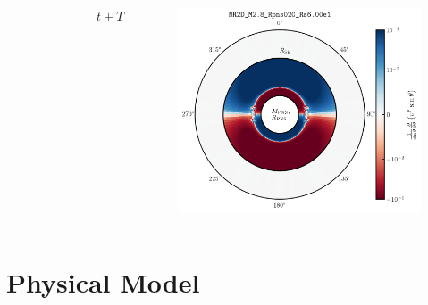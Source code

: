 \documentclass{beamer}
\begin{document}
\begin{frame}
\begin{columns}[c]
\begin{figure}[htb!]
      \end{figure}
      \centerline{$t+T$}
      \begin{figure}[htb!]
        \centering
        \includegraphics[width=\textwidth]{fig.DivV2_1.00T.png}
      \end{figure}

  \end{columns}

\end{frame}

\section{Physical Model}
\end{document}

